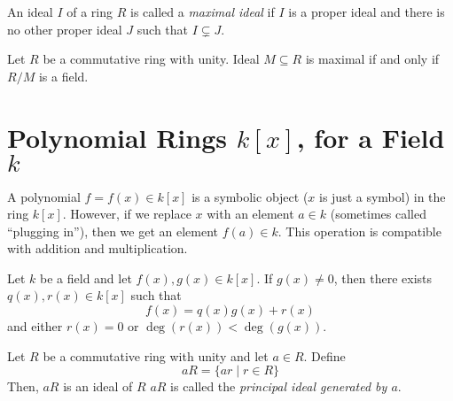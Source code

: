 \begin{definition}
	An ideal $I$ of a ring $R$ is called a \emph{maximal ideal} if $I$ is a proper
	ideal and there is no other proper ideal $J$ such that $I \subsetneq J$.
\end{definition}

\begin{theorem}
	Let $R$ be a commutative ring with unity. Ideal $M \subseteq R$ is maximal if
	and only if $R/M$ is a field.
\end{theorem}

\section*{Polynomial Rings $k[x]$, for a Field $k$}

\begin{definition}
	A polynomial $f = f(x) \in k[x]$ is a symbolic object ($x$ is just a symbol)
	in the ring $k[x]$. However, if we replace $x$ with an element $a \in k$
	(sometimes called ``plugging in''), then we get an element $f(a) \in k$. This
	operation is compatible with addition and multiplication.
\end{definition}

\begin{theorem}
	Let $k$ be a field and let $f(x), g(x) \in k[x]$. If $g(x) \neq 0$, then there
	exists $q(x), r(x) \in k[x]$ such that
	\[
		f(x) = q(x) g(x) + r(x)
	\]
	and either $r(x) = 0$ or $\deg(r(x)) < \deg(g(x))$.
\end{theorem}

\begin{definition}
	Let $R$ be a commutative ring with unity and let $a \in R$. Define
	\[
		aR = \{ar \mid r \in R\}
	\]
	Then, $aR$ is an ideal of $R$ $aR$ is called the \emph{principal ideal
	generated by $a$}.
\end{definition}
